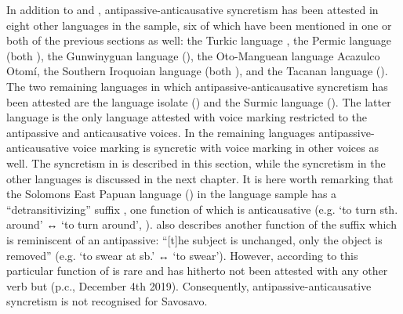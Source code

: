 In addition to  and , antipassive-anticausative syncretism has been attested in eight other languages in the sample, six of which have been mentioned in one or both of the previous sections as well: the Turkic language , the Permic language  (both ), the Gunwinyguan language  (), the Oto-Manguean language Acazulco Otomí, the Southern Iroquoian language  (both ), and the Tacanan language  (). The two remaining languages in which antipassive-anticausative syncretism has been attested are the language isolate  () and the Surmic language  (). The latter language is the only language attested with voice marking restricted to the antipassive and anticausative voices. In the remaining languages antipassive-anticausative voice marking is syncretic with voice marking in other voices as well. The syncretism in  is described in this section, while the syncretism in the other languages is discussed in the next chapter. It is here worth remarking that the Solomons East Papuan language  () in the language sample has a “detransitivizing” suffix , one function of which is anticausative (e.g.  ‘to turn sth. around’ ↔  ‘to turn around’, \citealt[275, 376]{wegener:2012}). \cite[171]{wegener:2012} also describes another function of the suffix which is reminiscent of an antipassive: “[t]he subject is unchanged, only the object is removed” (e.g.  ‘to swear at sb.’ ↔  ‘to swear’). However, according to \citeauthor{wegener:2012} this particular function of  is rare and has hitherto not been attested with any other verb but  (p.c., December 4th 2019). Consequently, antipassive-anticausative syncretism is not recognised for Savosavo.


